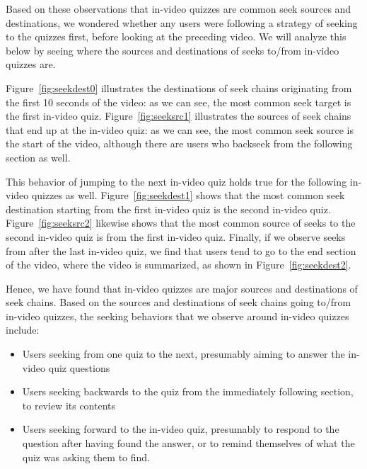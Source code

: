 \documentclass{sigchi}
\begin{document}
Based on these observations that in-video quizzes are common seek sources and destinations, we wondered whether any users were following a strategy of seeking to the quizzes first, before looking at the preceding video. We will analyze this below by seeing where the sources and destinations of seeks to/from in-video quizzes are.


Figure~\ref{fig:seekdest0} illustrates the destinations of seek chains originating from the first 10 seconds of the video: as we can see, the most common seek target is the first in-video quiz. Figure~\ref{fig:seeksrc1} illustrates the sources of seek chains that end up at the in-video quiz: as we can see, the most common seek source is the start of the video, although there are users who backseek from the following section as well.

This behavior of jumping to the next in-video quiz holds true for the following in-video quizzes as well. Figure~\ref{fig:seekdest1} shows that the most common seek destination starting from the first in-video quiz is the second in-video quiz. Figure~\ref{fig:seeksrc2} likewise shows that the most common source of seeks to the second in-video quiz is from the first in-video quiz. Finally, if we observe seeks from after the last in-video quiz, we find that users tend to go to the end section of the video, where the video is summarized, as shown in Figure~\ref{fig:seekdest2}.

Hence, we have found that in-video quizzes are major sources and destinations of seek chains. Based on the sources and destinations of seek chains going to/from in-video quizzes, the seeking behaviors that we observe around in-video quizzes include:

\begin{itemize}
\item Users seeking from one quiz to the next, presumably aiming to answer the in-video quiz questions
\item Users seeking backwards to the quiz from the immediately following section, to review its contents
\item Users seeking forward to the in-video quiz, presumably to respond to the question after having found the answer, or to remind themselves of what the quiz was asking them to find.
\end{itemize}
\end{document}
